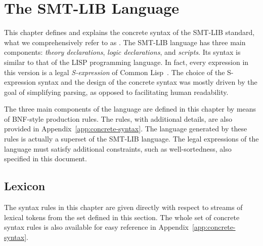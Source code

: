 


\chapter{The SMT-LIB Language} \label{chap:concrete-syntax}
\thispagestyle{empty}

This chapter defines and explains the concrete syntax of the SMT-LIB standard, 
what we comprehensively refer to as .
The SMT-LIB language has three main components:
\emph{theory declarations}, \emph{logic declarations}, and \emph{scripts}. 
%
Its syntax is similar to that of the LISP programming language.
In fact, every expression in this version is 
a legal \emph{S-expression} of Common Lisp~\cite{Ste-90}. 
The choice of the S-expression syntax and 
the design of the concrete syntax was mostly driven by the goal of simplifying parsing,
as opposed to facilitating human readability.

The three main components of the language are defined in this chapter 
by means of BNF-style production rules.
The rules, with additional details, are also provided in Appendix~\ref{app:concrete-syntax}.
The language generated by these rules is actually a superset
of the SMT-LIB language.
The legal expressions of the language must satisfy additional constraints,
such as well-sortedness,
also specified in this document.



\section{Lexicon}

The syntax rules in this chapter are given directly with respect to streams
of lexical tokens from the set defined in this section.
The whole set of concrete syntax rules is also available 
for easy reference in Appendix~\ref{app:concrete-syntax}.

